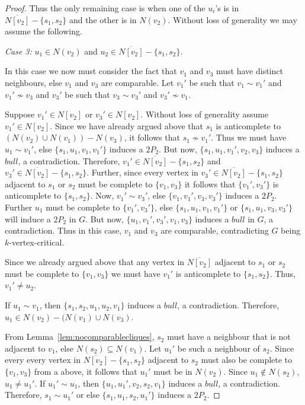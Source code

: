 \documentclass[11pt]{article}
\theoremstyle{definition}
\begin{document}
\begin{proof}
Thus the only remaining case is when one of the $u_i$'s is in $\overline{N[v_2]}-\{s_1,s_2\}$ and the other is in $N(v_2)$. Without loss of generality we may assume the following.

\noindent \textit{Case 3:} $u_1\in N(v_2)$ and $u_2\in\overline{N[v_2]}-\{s_1,s_2\}$.

In this case we now must consider the fact that $v_1$ and $v_3$ must have distinct neighbours, else $v_1$ and $v_3$ are comparable. Let $v_1'$ be such that $v_1\sim v_1'$ and $v_1'\nsim v_3$ and $v_3'$ be such that $v_3\sim v_3'$ and $v_3'\nsim v_1$. 

Suppose $v_1'\in N[v_2]$ or $v_3'\in N[v_2]$. Without loss of generality assume $v_1'\in N[v_2]$. Since we have already argued above that $s_1$ is anticomplete to $(N(v_2)\cup N(v_1))-N(v_3)$, it follows that $s_1\nsim v_1'$. Thus we must have $u_1\sim v_1'$, else $\{s_1,u_1,v_1,v_1'\}$ induces a $2P_2$. But now, $\{s_1,u_1,v_1',v_2,v_3\}$ induces a $bull$, a contradiction. Therefore,  $v_1'\in \overline{N[v_2]}-\{s_1,s_2\}$ and $v_3'\in \overline{N[v_2]}-\{s_1,s_2\}$. Further, since every vertex in $v_3'\in \overline{N[v_2]}-\{s_1,s_2\}$ adjacent to $s_1$ or $s_2$ must be complete to $\{v_1,v_3\}$ it follows that $\{v_1',v_3'\}$ is anticomplete to $\{s_1,s_2\}$. Now, $v_1'\sim v_3'$, else $\{v_1,v_1',v_3,v_3'\}$ induces a $2P_2$. Further $u_1$ must be complete to $\{v_1',v_3'\}$, else $\{s_1,u_1,v_1,v_1'\}$ or $\{s_1,u_1,v_3,v_3'\}$ will induce a $2P_2$ in $G$. But now, $\{u_1,v_1',v_3',v_1,v_3\}$ induces a $bull$ in $G$, a contradiction. Thus in this case, $v_1$ and $v_3$ are comparable, contradicting $G$ being $k$-vertex-critical.



 
Since we already argued above that any vertex in $\overline{N[v_2]}$ adjacent to $s_1$ or $s_2$ must be complete to $\{v_1,v_3\}$ we must have $v_1'$ is anticomplete to $\{s_1,s_2\}$. Thus, $v_1'\neq u_2$.


If $u_1\sim v_1$, then $\{s_1,s_2,u_1,u_2,v_1\}$ induces a $bull$, a contradiction. Therefore, $u_1\in N(v_2)-(N(v_1)\cup N(v_3)$. 

From Lemma~\ref{lem:nocomparablecliques}, $s_2$ must have a neighbour that is not adjacent to $v_1$, else $N(s_2)\subseteq N(v_1)$. Let $u_1'$ be such a neighbour of $s_2$. Since every every vertex in $\overline{N[v_2]}-\{s_1,s_2\}$ adjacent to $s_2$ must also be complete to $\{v_1,v_3\}$ from a above, it follows that $u_1'$ must be in $N(v_2)$. Since $u_1\not\in N(s_2)$, $u_1\neq u_1'$. If $u_1'\sim u_1$, then $\{u_1,u_1',v_2,s_2,v_1\}$ induces a $bull$, a contradiction. Therefore, $s_1\sim u_1'$ or else $\{s_1,u_1,s_2,u_1'\}$ induces a $2P_2$. 


\end{proof}
\end{document}
